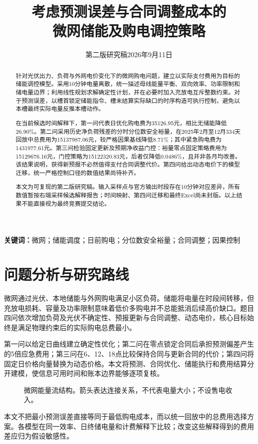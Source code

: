 \documentclass[UTF8,a4paper,zihao=-4,fontset=fandol]{ctexart}
\title{考虑预测误差与合同调整成本的\\微网储能及购电调控策略}
\author{}\date{第二版研究稿\quad 2026年9月11日}
\begin{document}
\maketitle\vspace{-2em}
\begin{abstract}
针对光伏出力、负荷与外网电价变化下的微网购电问题，建立以实际支付费用为目标的储能调控模型。采用10分钟电量离散，统一描述母线能量平衡、双向效率、功率限制和储电量边界；利用线性规划求解确定性计划，并在必要时加入充放电互斥整数约束。对于预测误差，以槽首锁定储能指令、槽末结算实际缺口的时序构造可执行控制，避免以本槽最终实际电量反推本槽动作。

在当前候选时间解释下，第一问代表日优化购电费为35126.95元，相比无储能降低26.90\%。第二问采用历史净负荷残差的分时分位数安全裕量，在2025年2月至12月334天回放中总费用为15137987.06元，较严格因果基线降低8.71\%；其中紧急购电费为1431977.61元。第三问检验固定更新及预期净收益门控：裕量零点固定策略费用为15129676.16元，门控策略为15122320.83元，后者仅降低0.0486\%，且并非各月均改善。该结果说明，获得新预报不必然值得支付合同调整代价。第四问给出动态电价下的模型迁移，统一严格控制口径的数值结果尚待补齐。

本文为可复现的第二版研究稿。输入采样点与官方输出时段存在10分钟对应差异，所有数值暂按右端采样候选解释报告；时间映射、第四问迁移和最终Excel尚未封版。以上结果不能直接视为最终竞赛提交结论。
\end{abstract}
\noindent\textbf{关键词：}微网；储能调度；日前购电；分位数安全裕量；合同调整；因果控制
\newpage
\section{问题分析与研究路线}
微网通过光伏、本地储能与外网购电满足小区负荷。储能将电量在时段间转移，但充放电损耗、容量及功率限制意味着低价多购电并不总能抵消后续高价缺口。题目四问依次增加负荷及光伏不确定性、预报更新与合同调整、动态电价，核心目标始终是满足物理约束后的实际购电总费最小\cite{problem}。

第一问以给定日曲线建立确定性优化；第二问在零点锁定合同后承担预测偏差产生的5倍应急费用；第三问在6、12、18点比较保持合同与更新合同的代价；第四问将固定日价格向量替换为动态价格。本文将预测、合同优化、储能执行和费用结算分开建模，使信息可用时间和账本边界能够逐项复核。
\begin{figure}[H]\centering
{}
\caption{微网能量流结构。箭头表达连接关系，不代表电量大小；不设售电收入。}
\end{figure}
本文不把最小预测误差直接等同于最低购电成本，而以统一回放中的总费用选择方案。各模型在同一效率、日终储电量和计费解释下比较；改变这些解释得到的费用差应归为假设敏感性。
\end{document}
